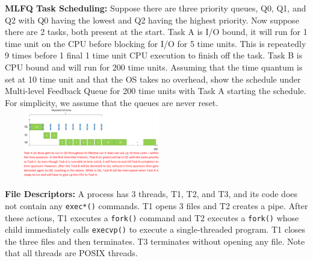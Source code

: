 \documentclass[10pt,landscape]{article}
\begin{document}
\begin{multicols*}{3}
\textbf{MLFQ Task Scheduling:}
Suppose there are three priority queues, Q0, Q1, and Q2 with Q0 having the
lowest and Q2 having the highest priority. Now suppose there are 2 tasks, both
present at the start. Task A is I/O bound, it will run for 1 time unit on the CPU before
blocking for I/O for 5 time units. This is repeatedly 9 times before 1 final 1 time unit
CPU execution to finish off the task. Task B is CPU bound and will run for 200 time
units. Assuming that the time quantum is set at 10 time unit and that the OS takes no
overhead, show the schedule under Multi-level Feedback Queue for 200 time units
with Task A starting the schedule. For simplicity, we assume that the queues are never
reset.
\includegraphics*[width=7.6cm, height=3cm]{images/mlfqscheduling.png}

\textbf{File Descriptors:}
A process has 3 threads, T1, T2, and T3, and its code does not contain any \verb|exec*()|
commands. T1 opens 3 files and T2 creates a pipe. After these actions, T1 executes a
\verb|fork()| command and T2 executes a \verb|fork()| whose child immediately calls \verb|execvp()| to
execute a single-threaded program. T1 closes the three files and then terminates. T3
terminates without opening any file. Note that all threads are POSIX threads.



\end{multicols*}
\end{document}
